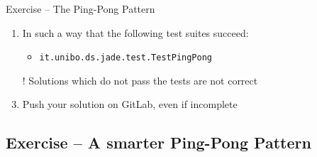 \documentclass{beamer}\mode<presentation>{\usetheme{AMSCesenaPurpleAndGold}}
\begin{document}
\begin{frame}[c,allowframebreaks]{Exercise \currentExercise{} -- The Ping-Pong Pattern}
\begin{enumerate}
		\medskip
		
		\item In such a way that the following test suites succeed:
		\begin{itemize}
			\item \texttt{it.unibo.ds.jade.test.\alert{TestPingPong}}
		\end{itemize}
		
		\medskip
		
		\item[!] Solutions which do not pass the tests are not correct
		
		\medskip
		
		\item Push your solution on GitLab, \alert{even if incomplete}
		
	\end{enumerate}
	
\end{frame}

\startExercise

\subsection{Exercise \currentExercise{} -- A smarter Ping-Pong Pattern}
\end{document}
